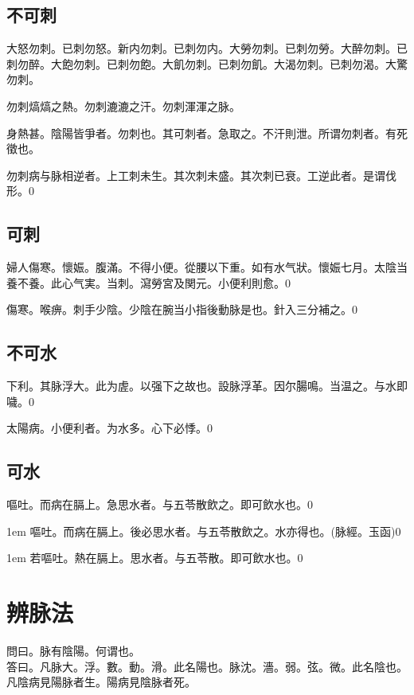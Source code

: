 \section{不可刺}

大怒勿刺。{\khaaitp 已刺勿怒。}新内勿刺。{\khaaitp 已刺勿内。}大勞勿刺。{\khaaitp 已刺勿勞。}大醉勿刺。{\khaaitp 已刺勿醉。}大飽勿刺。{\khaaitp 已刺勿飽。大飢勿刺。已刺勿飢。}大渴勿刺。{\khaaitp 已刺勿渴。}大驚勿刺。

勿刺熇熇之熱。勿刺漉漉之汗。勿刺渾渾之脉。

身熱甚。陰陽皆爭者。勿刺也。其可刺者。急取之。不汗則泄。所谓勿刺者。有死徵也。

勿刺病与脉相逆者。上工刺未生。其次刺未盛。其次刺已衰。工逆此者。是谓伐形。0

\section{可刺}

婦人傷寒。懷娠。腹滿。不得小便。從腰以下重。如有水气狀。懷娠七月。太陰当養不養。此心气実。当刺。瀉勞宮及関元。小便利則愈。0

傷寒。喉痹。刺手少陰。少陰在腕当小指後動脉是也。針入三分補之。0

\section{不可水}

下利。其脉浮大。此为虗。以强下之故也。設脉浮革。因尔腸鳴。当温之。与水即噦。0

太陽病。小便利者。为水多。心下必悸。0

\section{可水}

嘔吐。而病在膈上。急思水者。与五苓散飲之。即可飲水也。0

\hangindent 1em
嘔吐。而病在膈上。後必思水者。与五苓散飲之。水亦得也。(脉經。玉函)0

\hangindent 1em
若嘔吐。熱在膈上。思水者。与五苓散。即可飲水也。{\gaoben}0

\chapter{辨脉法}

問曰。脉有陰陽。何谓也。\\
答曰。凡脉大。浮。數。動。滑。此名陽也。脉沈。濇。弱。弦。微。此名陰也。凡陰病見陽脉者生。陽病見陰脉者死。

